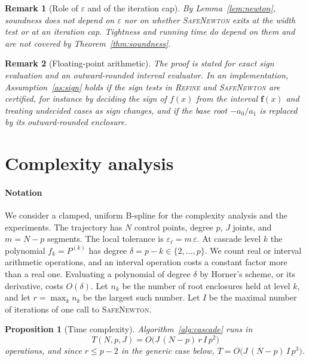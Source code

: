\documentclass[final,5p,times,twocolumn]{elsarticle}
\newtheorem{remark}{Remark}
\newtheorem{proposition}{Proposition}
\theoremstyle{definition}
\newcommand{\iv}[1]{\mathbf{#1}}
\begin{document}
\begin{remark}[Role of $\varepsilon$ and of the iteration cap]
By Lemma~\ref{lem:newton}, soundness does not depend on $\varepsilon$ nor on whether \textsc{SafeNewton} exits at the width test or at an iteration cap. Tightness and running time do depend on them and are not covered by Theorem~\ref{thm:soundness}.
\end{remark}

\begin{remark}[Floating-point arithmetic]
The proof is stated for exact sign evaluation and an outward-rounded interval evaluator. In an implementation, Assumption~\ref{as:sign} holds if the sign tests in \textsc{Refine} and \textsc{SafeNewton} are certified, for instance by deciding the sign of $f(x)$ from the interval $\iv{f}(x)$ and treating undecided cases as sign changes, and if the base root $-a_0/a_1$ is replaced by its outward-rounded enclosure.
\end{remark}


\section{Complexity analysis} \label{sec:complexity_analysis}
\paragraph*{Notation}
We consider a clamped, uniform B-spline for the complexity analysis and the experiments. The trajectory has $N$ control points, degree $p$, $J$ joints, and $m=N-p$ segments. The local tolerance is $\varepsilon_\ell=m\,\varepsilon$. At cascade level $k$ the polynomial $f_k=P^{(k)}$ has degree $\delta=p-k\in\{2,\dots,p\}$. We count real or interval arithmetic operations, and an interval operation costs a constant factor more than a real one. Evaluating a polynomial of degree $\delta$ by Horner's scheme, or its derivative, costs $O(\delta)$. Let $n_k$ be the number of root enclosures held at level $k$, and let $r=\max_k n_k$ be the largest such number. Let $I$ be the maximal number of iterations of one call to \textsc{SafeNewton}.

\begin{proposition}[Time complexity]\label{prop:time}
Algorithm~\ref{alg:cascade} runs in
\begin{equation}
  T(N,p,J)=O\big(J\,(N-p)\,r\,I\,p^{2}\big)
\end{equation}
operations, and since $r\le p-2$ in the generic case below, $T=O\big(J\,(N-p)\,I\,p^{3}\big)$.
\end{proposition}
\end{document}
